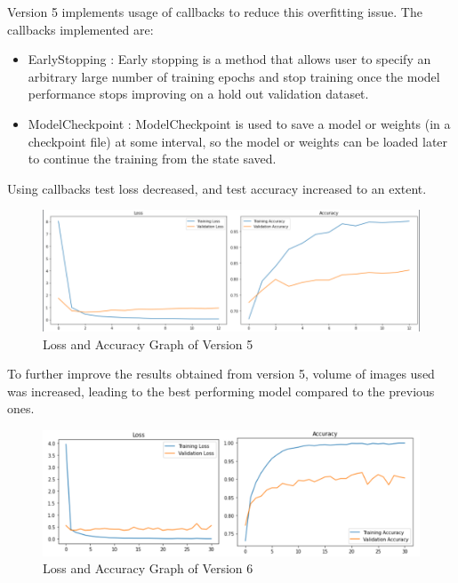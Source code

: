 Version 5 implements usage of callbacks to reduce this overfitting issue. The callbacks implemented are:
\begin{itemize}
    \item EarlyStopping : Early stopping is a method that allows user to specify an arbitrary large number of training epochs and stop training once the model performance stops improving on a hold out validation dataset.
    \item ModelCheckpoint : ModelCheckpoint is used to save a model or weights (in a checkpoint file) at some interval, so the model or weights can be loaded later to continue the training from the state saved.
\end{itemize}
Using callbacks test loss decreased, and test accuracy increased to an extent.
\begin{figure}[H]
\includegraphics[scale=0.6]{Photos/v5.PNG}
\caption{Loss and Accuracy Graph of Version 5} \label{fig:ishan}
\end{figure}

To further improve the results obtained from version 5, volume of images used was increased, leading to the best performing model compared to the previous ones.
\begin{figure}[H]
\includegraphics[scale=0.4]{Photos/v6.png}
\caption{Loss and Accuracy Graph of Version 6} \label{fig:ishan}
\end{figure}
    
